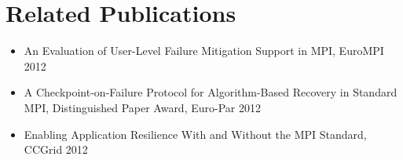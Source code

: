 \section{Related Publications}\label{sect:publications}

\begin{itemize}

\item An Evaluation of User-Level Failure Mitigation Support in MPI, EuroMPI
    2012~\cite{Bland:2012tp}

\item A Checkpoint-on-Failure Protocol for Algorithm-Based Recovery in Standard
    MPI, Distinguished Paper Award, Euro-Par 2012~\cite{Bland:2012tw}

\item Enabling Application Resilience With and Without the MPI Standard, CCGrid
    2012~\cite{Bland:2012gy}

\end{itemize}
